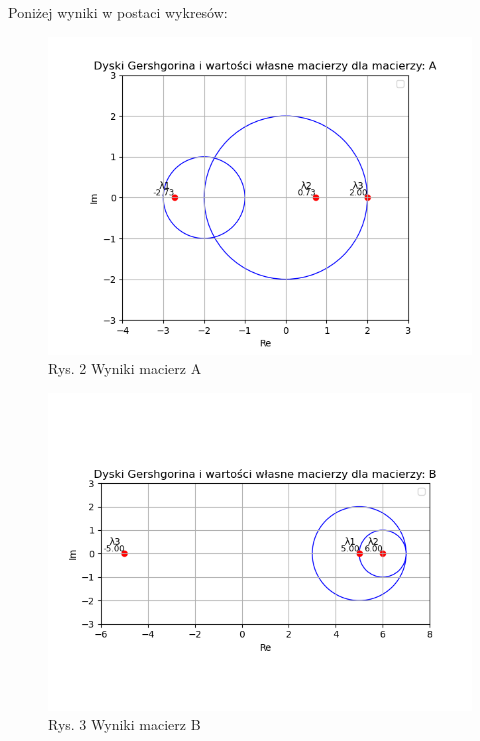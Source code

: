 \documentclass{article}
\begin{document}
Poniżej wyniki w postaci wykresów:
\begin{figure}[!h]
\includegraphics[scale=0.5]{matrixA.png}
\centering
\caption*{Rys. 2 Wyniki macierz A}
\end{figure}

\begin{figure}[!h]
\includegraphics[scale=0.5]{matrixB.png}
\centering
\caption*{Rys. 3 Wyniki macierz B}
\end{figure}
\end{document}
